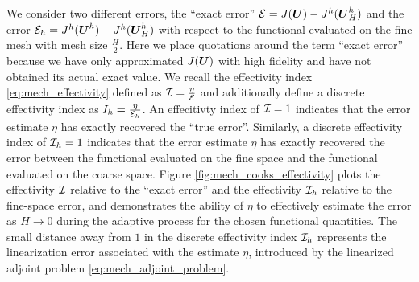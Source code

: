 We consider two different errors, the ``exact error'' $\mathcal{E} = J(\boldsymbol{U}) -
J^h(\boldsymbol{U}^h_H)$ and the error $\mathcal{E}_h = J^h(\boldsymbol{U}^h) - J^h(\boldsymbol{U}^h_H)$
with respect to the functional evaluated on the fine mesh with mesh size
$\frac{H}{2}$. Here we place quotations around the term ``exact error''
because we have only approximated $J(\boldsymbol{U})$ with high fidelity and have
not obtained its actual exact value. We recall the effectivity index
\eqref{eq:mech_effectivity} defined as $\mathcal{I} = \frac{\eta}{\mathcal{E}}$ and additionally
define a discrete effectivity index as $I_h = \frac{\eta}{\mathcal{E}_h}$. An
effecitivty index of $\mathcal{I} = 1$ indicates that the error estimate $\eta$ has
exactly recovered the ``true error''. Similarly, a discrete effectivity index
of $\mathcal{I}_h = 1$ indicates that the error estimate $\eta$ has exactly recovered
the error between the functional evaluated on the fine space and the
functional evaluated on the coarse space. Figure
\ref{fig:mech_cooks_effectivity} plots the effectivity $\mathcal{I}$ relative to the
``exact error'' and the effectivity $\mathcal{I}_h$ relative to the fine-space error,
and demonstrates the ability of $\eta$ to effectively estimate the error as
$H \to 0$ during the adaptive process for the chosen functional quantities.
The small distance away from $1$ in the discrete effectivity index $\mathcal{I}_h$
represents the linearization error associated with the estimate $\eta$,
introduced by the linearized adjoint problem \eqref{eq:mech_adjoint_problem}.



